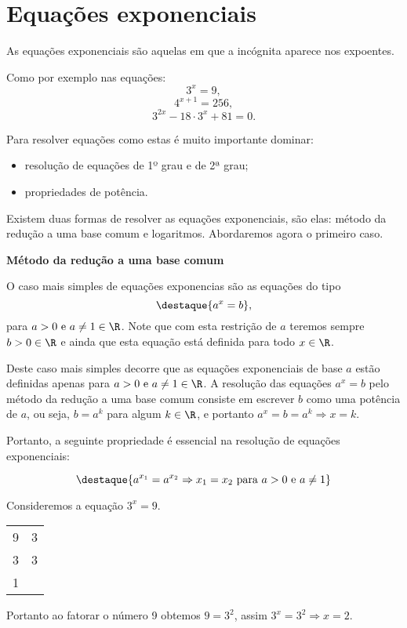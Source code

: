 \section{Equações exponenciais}

  \vskip0.3cm
 \colorbox{azul}{
 \begin{minipage}{0.9\linewidth}
 \begin{center}
  As equações exponenciais são aquelas em que a incógnita aparece nos expoentes.
 \end{center}
 \end{minipage}}
 \vskip0.3cm

 Como por exemplo nas equações:
 \[3^x= 9 ,\]
 \[4^{x+1}= 256 ,\]
 \[3^{2x}- 18\cdot 3^x + 81=0 .\]

 Para resolver equações como estas é muito importante dominar:
 \begin{itemize}
  \item resolução de equações de 1º grau e de 2ª grau;
  \item propriedades de potência.
 \end{itemize}

 Existem duas formas de resolver as equações exponenciais, são elas: método da redução a uma base comum e logaritmos. Abordaremos agora o primeiro caso.

 \vskip0.3cm

 \textbf{Método da redução a uma base comum}

 \vskip0.3cm

 O caso mais simples de equações exponencias são as equações do tipo
 \[\destaque{a^{x}= b} ,\]
 para $a > 0 \text{ e } a \neq 1 \in \R$. Note que com esta restrição de $a$ teremos sempre $b > 0 \in \R$ e ainda que esta equação está definida para todo $x \in \R$.

 Deste caso mais simples decorre que as equações exponenciais de base $a$ estão definidas apenas para $a > 0 \text{ e } a \neq 1 \in \R$. A resolução das equações $a^x= b$ pelo método da redução a uma base comum consiste em escrever $b$ como uma potência de $a$, ou seja, $b= a^k$  para algum $k \in \R$, e portanto $a^{x}= b= a^{k} \Rightarrow x= k$.

 Portanto, a seguinte propriedade é essencial na resolução de equações exponenciais:

 \[\destaque{ a^{x_1}= a^{x_2} \Rightarrow x_1= x_2 \text{ para } a>0 \text{ e } a \neq 1}\]

 \begin{exem}
  Consideremos a equação $3^x= 9$.

  \begin{tabular}{c|c}
  9 & 3 \\
  3 & 3 \\
  1 &
  \end{tabular}

  Portanto ao fatorar o número 9 obtemos $9= 3^2$, assim $3^x= 3^2 \Rightarrow x= 2$.
 \end{exem}

